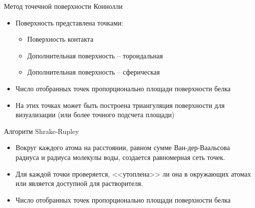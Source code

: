 \documentclass{beamer}
\begin{document}
    \begin{frame}{Метод точечной поверхности Коннолли}
        \begin{itemize}
        \item Поверхность представлена точками:
            \begin{itemize}
            \item Поверхность контакта
            \item Дополнительная поверхность -- тороидальная
            \item Дополнительная поверхность -- сферическая
            \end{itemize}
        \item Число отобранных точек пропорционально площади поверхности белка
        \item На этих точках может быть построена триангуляция поверхности для
            визуализации (или более точного подсчета площади)
        \end{itemize}
    \end{frame}

    \begin{frame}{Алгоритм Shrake-Rupley}
        \begin{itemize}
        \item Вокруг каждого атома на расстоянии, равном сумме Ван-дер-Ваальсова
            радиуса и радиуса молекулы воды, создается равномерная сеть точек.
        \item Для каждой точки проверяется, <<утоплена>> ли она в окружающих
            атомах или является доступной для растворителя.
        \item Число отобранных точек пропорционально площади поверхности белка
        \end{itemize}
    \end{frame}
\end{document}
